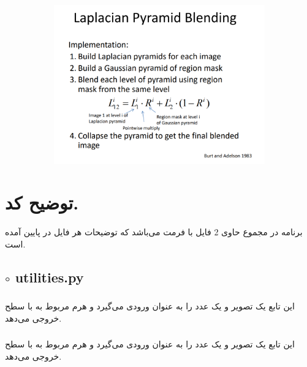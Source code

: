 \documentclass[a4paper,12pt]{article}
\begin{document}
	\begin{figure}[H]
		\centering
		\begin{subfigure}{0.9\textwidth}
			\centering
			\includegraphics[width=\textwidth]{3.png}
		\end{subfigure}
	\end{figure}
	
	
	
	\section*{توضیح کد.}
	برنامه در مجموع حاوی 2 فایل با فرمت
	می‌باشد که توضیحات هر فایل در پایین آمده است.
	\subsection*{$\circ$ utilities.py}
	\subsubsection*{}
	این تابع یک تصویر و یک عدد را به عنوان ورودی می‌گیرد و هرم 
	مربوط به 
	با 
	سطح خروجی می‌دهد.
	\subsubsection*{}
	این تابع یک تصویر و یک عدد را به عنوان ورودی می‌گیرد و هرم 
	مربوط به 
	با 
	سطح خروجی می‌دهد.
\end{document}
